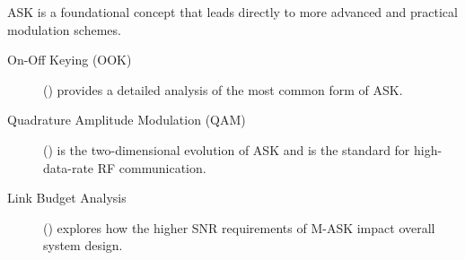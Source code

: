 \begin{importantbox}[title={Further Reading}]
    ASK is a foundational concept that leads directly to more advanced and practical modulation schemes.
    \begin{description}
        \item[On-Off Keying (OOK)] () provides a detailed analysis of the most common form of ASK.
        \item[Quadrature Amplitude Modulation (QAM)] () is the two-dimensional evolution of ASK and is the standard for high-data-rate RF communication.
        \item[Link Budget Analysis] () explores how the higher SNR requirements of M-ASK impact overall system design.
    \end{description}
\end{importantbox}